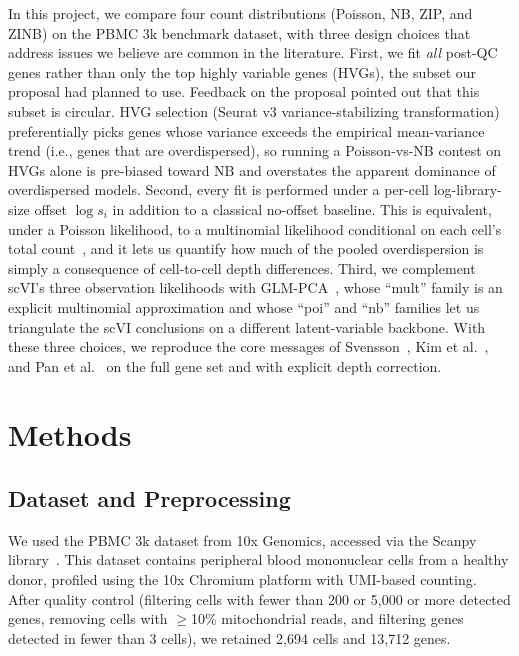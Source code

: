 \documentclass{article}
\begin{document}
In this project, we compare four count distributions (Poisson, NB, ZIP, and ZINB) on the PBMC 3k benchmark dataset, with three design choices that address issues we believe are common in the literature.
First, we fit \emph{all} post-QC genes rather than only the top highly variable genes (HVGs), the subset our proposal had planned to use.
Feedback on the proposal pointed out that this subset is circular.
HVG selection (Seurat v3 variance-stabilizing transformation) preferentially picks genes whose variance exceeds the empirical mean-variance trend (i.e., genes that are overdispersed), so running a Poisson-vs-NB contest on HVGs alone is pre-biased toward NB and overstates the apparent dominance of overdispersed models.
Second, every fit is performed under a per-cell log-library-size offset $\log s_i$ in addition to a classical no-offset baseline.
This is equivalent, under a Poisson likelihood, to a multinomial likelihood conditional on each cell's total count~\cite{townes2019feature}, and it lets us quantify how much of the pooled overdispersion is simply a consequence of cell-to-cell depth differences.
Third, we complement scVI's three observation likelihoods with GLM-PCA~\cite{townes2019feature}, whose ``mult'' family is an explicit multinomial approximation and whose ``poi'' and ``nb'' families let us triangulate the scVI conclusions on a different latent-variable backbone.
With these three choices, we reproduce the core messages of Svensson~\cite{svensson2020droplet}, Kim et al.~\cite{kim2020demystifying}, and Pan et al.~\cite{pan2023poisson} on the full gene set and with explicit depth correction.

\section{Methods}

\subsection{Dataset and Preprocessing}

We used the PBMC 3k dataset from 10x Genomics, accessed via the Scanpy library~\cite{wolf2018scanpy}.
This dataset contains peripheral blood mononuclear cells from a healthy donor, profiled using the 10x Chromium platform with UMI-based counting.
After quality control (filtering cells with fewer than 200 or 5{,}000 or more detected genes, removing cells with $\geq$10\% mitochondrial reads, and filtering genes detected in fewer than 3 cells), we retained 2{,}694 cells and 13{,}712 genes.
\end{document}
